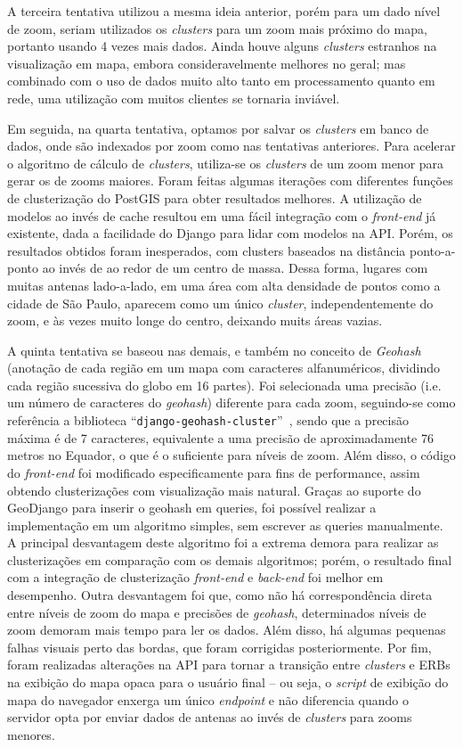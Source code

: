 \documentclass[]{politex}
\begin{document}
A terceira tentativa utilizou a mesma ideia anterior, porém para um dado nível
de zoom, seriam utilizados os \textit{clusters} para um zoom mais próximo do mapa,
portanto usando 4 vezes mais dados. Ainda houve alguns \textit{clusters} estranhos na
visualização em mapa, embora consideravelmente melhores no geral; mas combinado com o uso de
dados muito alto tanto em processamento quanto em rede, uma utilização com
muitos clientes se tornaria inviável.

Em seguida, na quarta tentativa, optamos por salvar os \textit{clusters} em banco de
dados, onde são indexados por zoom como nas tentativas anteriores. Para acelerar
o algoritmo de cálculo de \textit{clusters}, utiliza-se os \textit{clusters} de um zoom menor para
gerar os de zooms maiores. Foram feitas algumas iterações com diferentes funções
de clusterização do PostGIS para obter resultados melhores. A utilização de
modelos ao invés de cache resultou em uma fácil integração com o \textit{front-end} já
existente, dada a facilidade do Django para lidar com modelos na API. Porém,
os resultados obtidos foram inesperados, com clusters baseados na distância
ponto-a-ponto ao invés de ao redor de um centro de massa. Dessa forma, lugares
com muitas antenas lado-a-lado, em uma área com alta densidade de pontos como a
cidade de São Paulo, aparecem como um único \textit{cluster}, independentemente do zoom,
e às vezes muito longe do centro, deixando muits áreas vazias.

A quinta tentativa se baseou nas demais, e também no conceito de \textit{Geohash}
(anotação de cada região em um mapa com caracteres alfanuméricos, dividindo cada
região sucessiva do globo em 16 partes). Foi selecionada uma precisão (i.e. um
número de caracteres do \textit{geohash}) diferente para cada zoom, seguindo-se como
referência a biblioteca  ``\texttt{django-geohash-cluster}''~\cite{geohashcluster}, sendo
que a precisão máxima é de 7 caracteres, equivalente a uma precisão de aproximadamente 76
metros no Equador, o que é o suficiente para níveis de zoom.
Além disso, o código do \textit{front-end} foi modificado especificamente para fins de
performance, assim obtendo clusterizações com visualização mais natural.
Graças ao suporte do GeoDjango para inserir o geohash em queries, foi possível
realizar a implementação em um algoritmo simples, sem escrever as queries
manualmente. A principal desvantagem deste algoritmo foi a extrema demora para
realizar as clusterizações em comparação com os demais algoritmos; porém, o
resultado final com a integração de clusterização \textit{front-end} e \textit{back-end} foi
melhor em desempenho. Outra desvantagem foi que, como não há correspondência direta entre
níveis de zoom do mapa e precisões de \textit{geohash}, determinados níveis de zoom
demoram mais tempo para ler os dados. Além disso, há algumas pequenas falhas
visuais perto das bordas, que foram corrigidas posteriormente. Por fim,
foram realizadas alterações na API para tornar a transição entre \textit{clusters} e
ERBs na exibição do mapa opaca para o usuário final -- ou seja, o \textit{script} de exibição do mapa do
navegador enxerga um único \textit{endpoint} e não diferencia quando o servidor opta por
enviar dados de antenas ao invés de \textit{clusters} para zooms menores.
\end{document}
